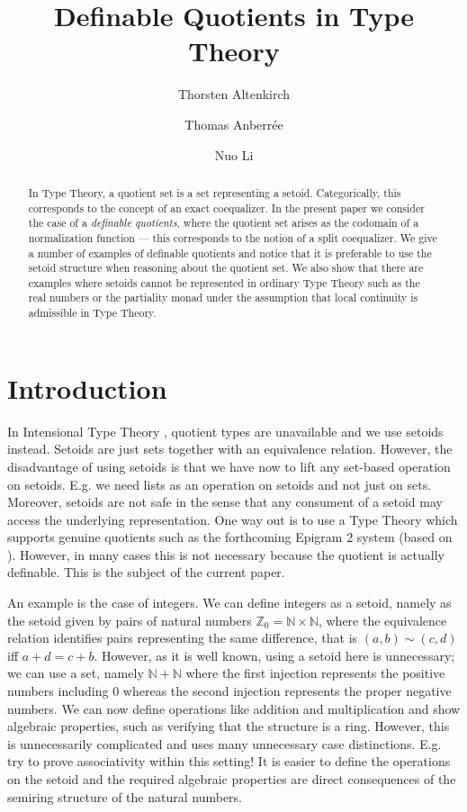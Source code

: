 \documentclass[envcountsame]{llncs}
\title{Definable Quotients in Type Theory}
\author{Thorsten Altenkirch     \inst{1}
   \and Thomas   Anberr\'{e}e   \inst{2}
   \and Nuo      Li             \inst{2}}
\institute{
School of Computer Science, University of Nottingham, Jubilee Campus, Wollaton Road, Nottingham, NG8 1BB, UK
\and
School of Computer Science, University of Nottingham, Ningbo Campus, 199 Taikang East Road, Ningbo, 315100, China}
\newcommand{\N}{\mathbb{N}}
\newcommand{\Z}{\mathbb{Z}}
\begin{document}
\maketitle

\begin{abstract}
  In Type Theory, a quotient set is a set representing a setoid.
  Categorically, this corresponds to the concept of an exact
  coequalizer. In the present paper we consider the case of a
  \emph{definable quotients}, where the quotient set arises as the
  codomain of a normalization function --- this corresponds to the
  notion of a split coequalizer.  We give a number of examples of
  definable quotients and notice that it is preferable to use the
  setoid structure when reasoning about the quotient set. We also show
  that there are examples where setoids cannot be represented in
  ordinary Type Theory such as the real numbers or the partiality
  monad under the assumption that local continuity is admissible in
  Type Theory.
\end{abstract}

\section{Introduction}\label{sec:introduction}

In Intensional Type Theory \cite{nordstrom1990programming}, quotient
types are unavailable and we use setoids \cite{barthe2003setoids}
instead. Setoids are just sets together with an equivalence
relation. However, the disadvantage of using setoids is that we have
now to lift any set-based operation on setoids. E.g. we need lists as
an operation on setoids and not just on sets. Moreover, setoids are
not safe in the sense that any consument of a setoid may access the
underlying representation. One way out is to use a Type Theory which
supports genuine quotients such as the forthcoming Epigram 2 system (based on
\cite{alti:ott-conf}).  However, in many cases this is not
necessary because the quotient is actually definable. This is the
subject of the current paper.

An example is the case of integers. We can define integers as a
setoid, namely as the setoid given by pairs of natural numbers 
$\Z_0=\N\times\N$, where the equivalence relation identifies pairs
representing the same difference, that is  $(a,b)\sim(c,d)$ if{f} $a+d=c+b$.
However, as it is well known, using a setoid here is unnecessary; we
can use a set, namely $\N+\N$ where the first injection represents the
positive numbers including $0$ whereas the second injection represents
the proper negative numbers. We can now define operations like
addition and multiplication and show algebraic properties,
such as verifying that the structure is a ring. However, this is
unnecessarily complicated and uses many unnecessary case
distinctions. E.g. try to prove associativity within this setting!
It is easier to define the operations on the setoid and the required
algebraic properties are direct consequences of the semiring structure
of the natural numbers. 
\end{document}
